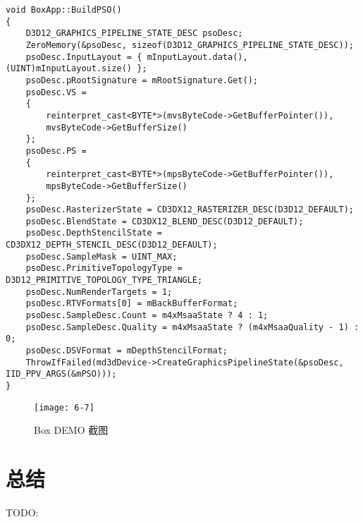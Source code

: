 \begin{lstlisting}
void BoxApp::BuildPSO()
{
    D3D12_GRAPHICS_PIPELINE_STATE_DESC psoDesc;
    ZeroMemory(&psoDesc, sizeof(D3D12_GRAPHICS_PIPELINE_STATE_DESC));
    psoDesc.InputLayout = { mInputLayout.data(), (UINT)mInputLayout.size() };
    psoDesc.pRootSignature = mRootSignature.Get();
    psoDesc.VS = 
    { 
        reinterpret_cast<BYTE*>(mvsByteCode->GetBufferPointer()), 
        mvsByteCode->GetBufferSize() 
    };
    psoDesc.PS = 
    { 
        reinterpret_cast<BYTE*>(mpsByteCode->GetBufferPointer()), 
        mpsByteCode->GetBufferSize() 
    };
    psoDesc.RasterizerState = CD3DX12_RASTERIZER_DESC(D3D12_DEFAULT);
    psoDesc.BlendState = CD3DX12_BLEND_DESC(D3D12_DEFAULT);
    psoDesc.DepthStencilState = CD3DX12_DEPTH_STENCIL_DESC(D3D12_DEFAULT);
    psoDesc.SampleMask = UINT_MAX;
    psoDesc.PrimitiveTopologyType = D3D12_PRIMITIVE_TOPOLOGY_TYPE_TRIANGLE;
    psoDesc.NumRenderTargets = 1;
    psoDesc.RTVFormats[0] = mBackBufferFormat;
    psoDesc.SampleDesc.Count = m4xMsaaState ? 4 : 1;
    psoDesc.SampleDesc.Quality = m4xMsaaState ? (m4xMsaaQuality - 1) : 0;
    psoDesc.DSVFormat = mDepthStencilFormat;
    ThrowIfFailed(md3dDevice->CreateGraphicsPipelineState(&psoDesc, IID_PPV_ARGS(&mPSO)));
}
\end{lstlisting}
\begin{figure}[h]
	\texttt{[image: 6-7]}
	\centering
	\caption{Box DEMO 截图}
	\label{fig:6-7}
\end{figure}

\section{总结}
TODO:

